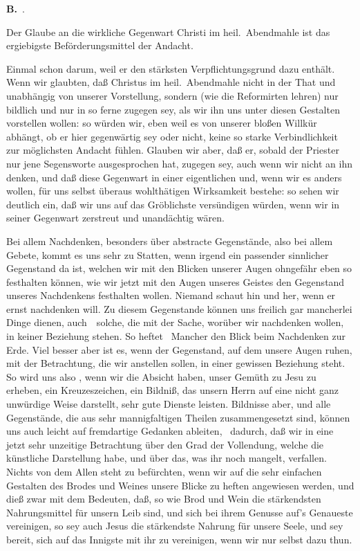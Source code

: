 \vabst \textbf{B.}~.\par
Der Glaube an die wirkliche Gegenwart Christi im heil.\ Abendmahle ist das ergiebigste Beförderungsmittel der Andacht.
\begin{aufzb}
\item Einmal schon darum, weil er den stärksten Verpflichtungsgrund dazu enthält. Wenn wir glaubten, daß Christus im heil.\ Abendmahle nicht in der That und unabhängig von unserer Vorstellung, sondern (wie die Reformirten lehren) nur bildlich und nur in so ferne zugegen sey, als wir ihn uns unter diesen Gestalten vorstellen wollen: so würden wir, eben weil es von unserer bloßen Willkür abhängt, ob er hier gegenwärtig sey oder nicht, keine so starke Verbindlichkeit zur möglichsten Andacht fühlen. Glauben wir aber, daß er, sobald der Priester nur jene Segensworte ausgesprochen hat, zugegen sey, auch wenn wir nicht an ihn denken, und daß diese Gegenwart in einer eigentlichen und, wenn wir es anders wollen, für uns selbst überaus wohlthätigen Wirksamkeit bestehe: so sehen wir deutlich ein, daß wir uns auf das Gröblichste versündigen würden, wenn wir in seiner Gegenwart zerstreut und unandächtig wären.
\item Bei allem Nachdenken, besonders über abstracte Gegenstände, also bei allem Gebete, kommt es uns sehr zu Statten, wenn irgend ein passender sinnlicher Gegenstand da ist, welchen wir mit den Blicken unserer Augen ohngefähr eben so festhalten können, wie wir jetzt mit den Augen unseres Geistes den Gegenstand unseres Nachdenkens festhalten wollen. Niemand schaut hin und her, wenn er ernst nachdenken will. Zu diesem Gegenstande können uns freilich gar mancherlei Dinge dienen, auch~\ solche, die mit der Sache, worüber wir nachdenken wollen, in keiner Beziehung stehen. So heftet \zB\  Mancher den Blick beim Nachdenken zur Erde. Viel besser aber ist es, wenn der Gegenstand, auf dem unsere Augen ruhen, mit der Betrachtung, die wir anstellen sollen, in einer gewissen Beziehung steht. So wird uns also \zB , wenn wir die Absicht haben, unser Gemüth zu Jesu zu erheben, ein Kreuzeszeichen, ein Bildniß, das unsern Herrn auf eine nicht ganz unwürdige Weise darstellt, sehr gute Dienste leisten. Bildnisse aber, und alle Gegenstände, die aus sehr mannigfaltigen Theilen zusammengesetzt sind, können uns auch leicht auf fremdartige Gedanken ableiten, \zB\  dadurch, daß wir in eine jetzt sehr unzeitige Betrachtung über den Grad der Vollendung, welche die künstliche Darstellung habe, und über das, was ihr noch mangelt, verfallen. Nichts von dem Allen steht zu befürchten, wenn wir auf die sehr einfachen Gestalten des Brodes und Weines unsere Blicke zu heften angewiesen werden, und dieß zwar mit dem Bedeuten, daß, so wie Brod und Wein die stärkendsten Nahrungsmittel für unsern Leib sind, und sich bei ihrem Genusse auf's Genaueste vereinigen, so sey auch Jesus die stärkendste Nahrung für unsere Seele, und sey bereit, sich auf das Innigste mit ihr zu vereinigen, wenn wir nur selbst dazu thun.

\end{aufzb}
